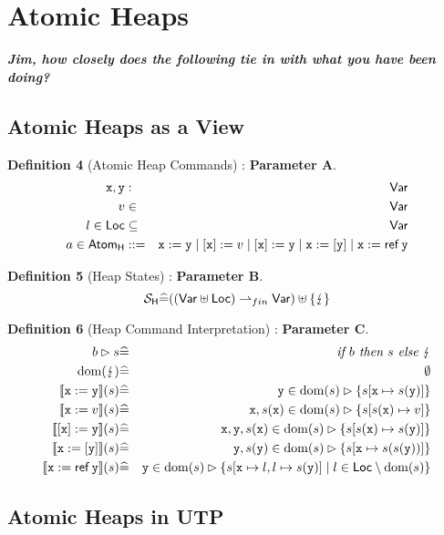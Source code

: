 \section{Atomic Heaps}\label{sec:atomicheaps}

\textbf{\emph{Jim,
how closely does the following tie in with what you have been doing?
}}
\subsection{Atomic Heaps as a View}

\textbf{Definition 4 }(Atomic Heap Commands) : \textbf{Parameter A}.
\begin{eqnarray*}
   \mathtt{x},\mathtt{y} &:& \mathsf{Var}
\\ v &\in& \mathsf{Var}
\\ l \in \mathsf{Loc} &\subseteq& \mathsf{Var}
\\ a \in \mathsf{Atom_{H}}
   &::=&
   \mathtt{x} := \mathtt{y}
   \mid
   [\mathtt{x}] := v
   \mid
   [\mathtt{x}] := \mathtt{y}
   \mid
   \mathtt{x} := [\mathtt{y}]
   \mid
   \mathtt{x} := \mathop{\mathsf{ref}}\mathtt{y}
\end{eqnarray*}

\textbf{Definition 5} (Heap States) : \textbf{Parameter B}.
\[
 \mathcal{S}_{\mathsf{H}} \widehat= ((\mathsf{Var} \uplus \mathsf{Loc}) \rightharpoonup_{fin} \mathsf{Var}) \uplus \{\lightning\}
\]

\textbf{Definition 6} (Heap Command Interpretation) : \textbf{Parameter C}.
\begin{eqnarray*}
   b \rhd s &\defs& \textit{if }b\textit{ then }s\textit{ else }\bang
\\ \dom(\bang) &\defs& \emptyset
\\ \sem{\vx:=\vy}(s)
              &\defs& \vy \in \dom(s)\rhd \setof{s[\vx \mapsto s(\vy)]}
\\ \sem{\vx:=v}(s)
              &\defs& \vx,s(\vx) \in \dom(s)\rhd \setof{s[s(\vx) \mapsto v]}
\\ \sem{[\vx]:=\vy}(s)
              &\defs& \vx,\vy,s(\vx) \in \dom(s)\rhd \setof{s[s(\vx) \mapsto s(\vy)]}
\\ \sem{\vx:=[\vy]}(s)
              &\defs& \vy,s(\vy) \in \dom(s)\rhd \setof{s[\vx \mapsto s(s(\vy))]}
\\ \sem{\vx:=\reft\vy}(s)
              &\defs& \vy \in \dom(s)\rhd
              \setof{s[\vx \mapsto l,l \mapsto s(\vy)] \mid l \in \Loc \setminus \dom(s) }
\end{eqnarray*}


\subsection{Atomic Heaps in UTP}

